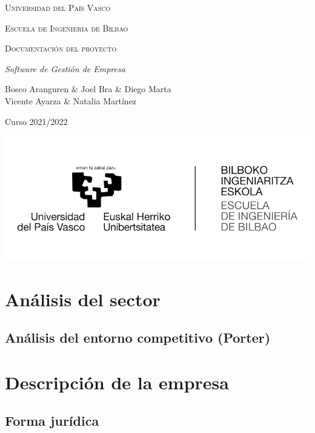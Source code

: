\documentclass[12pt, letterpaper]{article}
\begin{document}
\begin{titlepage}
    \centering
    {\scshape\Large Universidad del País Vasco \par}
    {\scshape\Large Escuela de Ingeniería de Bilbao \par}
    \vspace{2cm}
    {\scshape\Huge {Documentación del proyecto} \par}
    {\itshape\Large Software de Gestión de Empresa\par}
    \vspace{5cm} 
    {\Large Bosco Aranguren \& Joel Bra \& Diego Marta\\Vicente Ayarza \& Natalia Martínez\par}
    \vspace{0.2cm}
    {\large Curso 2021/2022 \par}
    \vspace{0.1cm}
    \includegraphics[scale=0.25]{Imagenes/logo.png}
\end{titlepage}
    
    
\thispagestyle{empty}
\clearpage
\tableofcontents
\clearpage
\section{Análisis del sector}

\subsection{Análisis del entorno competitivo (Porter)}

\pagebreak
\section{Descripción de la empresa}
\subsection{Forma jurídica}

\end{document}
